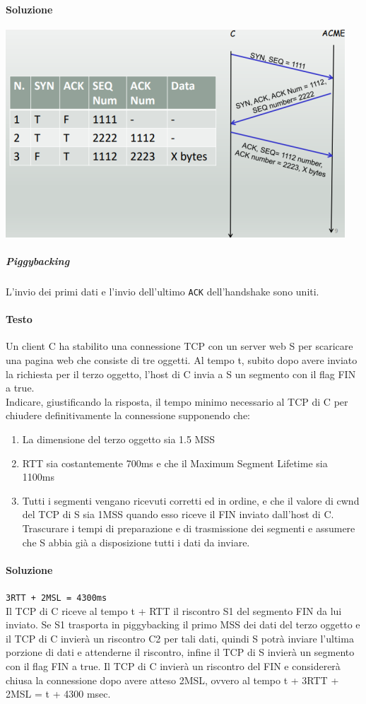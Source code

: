 \documentclass[10pt]{article}
\begin{document}
{\paragraph{Soluzione}
\begin{center}
\includegraphics[scale=1]{es_tcp1.png}
\end{center}
\subparagraph{Piggybacking} L'invio dei primi dati e l'invio dell'ultimo \texttt{ACK} dell'handshake sono uniti.
\paragraph{Testo} Un client C ha stabilito una connessione TCP con un server web S per scaricare una pagina web che consiste di tre oggetti. Al tempo t, subito dopo avere inviato la richiesta per il terzo oggetto, l’host di C invia a S un segmento con il flag FIN a true.\\
Indicare, giustificando la risposta, il tempo minimo necessario al TCP di C per chiudere definitivamente la connessione supponendo che:
\begin{enumerate}
\item La dimensione del terzo oggetto sia 1.5 MSS
\item RTT sia costantemente 700ms e che il Maximum Segment Lifetime sia 1100ms
\item Tutti i segmenti vengano ricevuti corretti ed in ordine, e che il valore di cwnd del TCP di S sia 1MSS quando esso riceve il FIN inviato dall’host di C. Trascurare i tempi di preparazione e di trasmissione dei segmenti e assumere che S abbia già a disposizione tutti i dati da inviare.
\end{enumerate}
\paragraph{Soluzione} \texttt{3RTT + 2MSL = 4300ms}\\
Il TCP di C riceve al tempo t + RTT il riscontro S1 del segmento FIN da lui inviato. Se S1 trasporta in piggybacking il primo MSS dei dati del terzo oggetto e il TCP di C invierà un riscontro C2 per tali dati, quindi S potrà inviare l’ultima porzione di dati e attenderne il riscontro, infine il TCP di S invierà un segmento con il flag FIN a true. Il TCP di C invierà un riscontro del FIN e considererà chiusa la connessione dopo avere atteso 2MSL, ovvero al tempo t + 3RTT + 2MSL = t + 4300 msec.
\pagebreak
}
\end{document}
